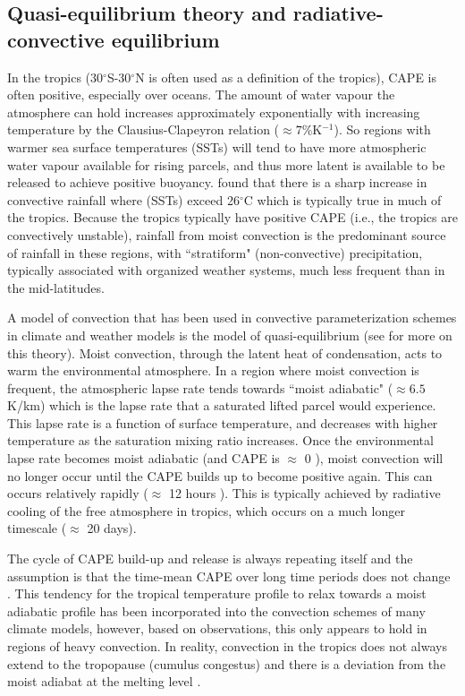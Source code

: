 \documentclass[letterpaper,12pt,titlepage,oneside,final]{book}
\begin{document}
\subsection{Quasi-equilibrium theory and radiative-convective equilibrium}\label{QET}

In the tropics (30$^\circ$S-30$^\circ$N is often used as a definition of the tropics), CAPE is often positive, especially over oceans. The amount of water vapour the atmosphere can hold increases approximately exponentially with increasing temperature by the Clausius-Clapeyron relation ($\approx {7\%}$K$^{-1}$). So regions with warmer sea surface temperatures (SSTs) will tend to have more atmospheric water vapour available for rising parcels, and thus more latent is available to be released to achieve positive buoyancy. \citep{folkins_ian_tropical_2003} found that there is a sharp increase in convective rainfall where (SSTs) exceed 26$^{\circ}$C which is typically true in much of the tropics. Because the tropics typically have positive CAPE (i.e., the tropics are convectively unstable), rainfall from moist convection is the predominant source of rainfall in these regions, with ``stratiform" (non-convective) precipitation, typically associated with organized weather systems, much less frequent than in the mid-latitudes.

A model of convection that has been used in convective parameterization schemes in climate and weather models is the model of quasi-equilibrium \citep{arakawa_and_schubert_interaction_1974} (see \cite{emanuel_quasi-equilibrium_2007} for more on this theory). Moist convection, through the latent heat of condensation, acts to warm the environmental atmosphere. In a region where moist convection is frequent, the atmospheric lapse rate tends towards ``moist adiabatic" ($\approx 6.5$K/km) which is the lapse rate that a saturated lifted parcel would experience. This lapse rate is a function of surface temperature, and decreases with higher temperature as the saturation mixing ratio increases. Once the environmental lapse rate becomes moist adiabatic (and CAPE is $\approx$ 0 \cite{merlis_general_2012}), moist convection will no longer occur until the CAPE builds up to become positive again. This can occurs relatively rapidly ($\approx$ 12 hours \cite{merlis_general_2012}). This is typically achieved by radiative cooling of the free atmosphere in tropics, which occurs on a much longer timescale ($\approx$ 20 days). 

The cycle of CAPE build-up and release is always repeating itself and the assumption is that the time-mean CAPE over long time periods does not change \citep{emanuel_quasi-equilibrium_2007}. This tendency for the tropical temperature profile to relax towards a moist adiabatic profile has been incorporated into the convection schemes of many climate models, however, based on observations, this only appears to hold in regions of heavy convection. In reality, convection in the tropics does not always extend to the tropopause (cumulus congestus) and there is a deviation from the moist adiabat at the melting level \citep{folkins_melting_2013}.
\end{document}
